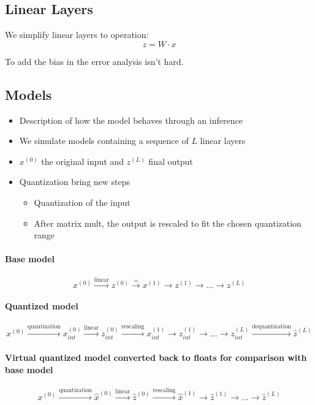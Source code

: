 \documentclass[11pt, a4paper]{article}
\begin{document}
\subsection{Linear Layers}

We simplify linear layers to operation:
$$ z = W \cdot x $$

To add the bias in the error analysis isn't hard.

\subsection{Models}

\begin{itemize}
\item Description of how the model behaves through an inference
\item We simulate models containing a sequence of $L$ linear layers
\item $x^{(0)}$ the original input and $z^{(L)}$ final output
\item Quantization bring new steps
\begin{itemize}
	\item Quantization of the input
	\item After matrix mult, the output is rescaled to fit the chosen quantization range
\end{itemize}
\end{itemize}

\paragraph{Base model}
$$
x^{(0)} \xrightarrow{\text{linear}} z^{(0)} \xrightarrow{\text{=}} x^{(1)} \rightarrow z^{(1)} \rightarrow ... \rightarrow z^{(L)}
$$


\paragraph{Quantized model}
$$
x^{(0)}
\xrightarrow{\text{quantization}} x^{(0)}_{int}
\xrightarrow{\text{linear}} z^{(0)}_{int}
\xrightarrow{\text{rescaling}} x^{(1)}_{int}
\rightarrow z^{(1)}_{int} \rightarrow ... \rightarrow z^{(L)}_{int}
\xrightarrow{\text{dequantization}} \hat{z}^{(L)}
$$

\paragraph{Virtual quantized model converted back to floats for comparison with base model}
$$
x^{(0)}
\xrightarrow{\text{quantization}} \hat{x}^{(0)}
\xrightarrow{\text{linear}} \hat{z}^{(0)}
\xrightarrow{\text{rescaling}} \hat{x}^{(1)} \rightarrow \hat{z}^{(1)} \rightarrow ...
\rightarrow \hat{z}^{(L)}
$$
\end{document}
